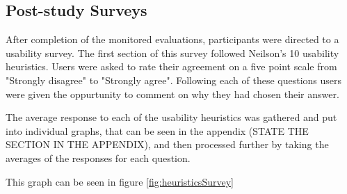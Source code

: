 \documentclass{l4proj}
\begin{document}
\subsection{Post-study Surveys}

After completion of the monitored evaluations, participants were directed to a usability survey. The first section of this survey
followed Neilson's 10 usability heuristics. Users were asked to rate their agreement on a five point scale from "Strongly disagree" to 
"Strongly agree". Following each of these questions users were given the oppurtunity to comment on why they had chosen their 
answer. 
\par 
The average response to each of the usability heuristics was gathered and put into individual graphs, that can be seen in the appendix
(STATE THE SECTION IN THE APPENDIX), and then processed further by taking the averages of the responses for each question.
\par 
This graph can be seen in figure \ref{fig:heuristicsSurvey}
\end{document}
